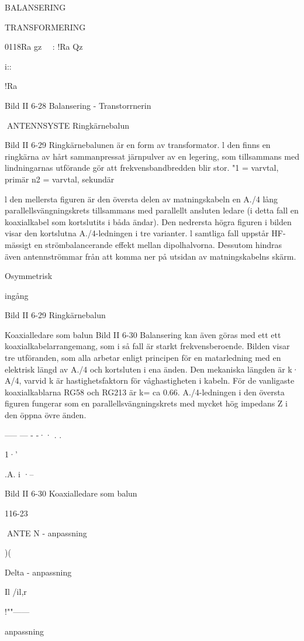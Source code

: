 \documentclass[a4paper,twoside,twocolumn,openright]{book}
\begin{document}
{{{{{BALANSERING

TRANSFORMERING

0118Ra
gz
~~: !Ra
Qz

i::

!Ra

Bild II 6-28 Balansering - Transtorrnerin

ANTENNSYSTE
Ringkärnebalun

Bild II 6-29
Ringkärnebalunen är en form av transformator. l den finns en ringkärna av hårt
sammanpressat järnpulver av en legering,
som tillsammans med lindningarnas utförande gör att frekvensbandbredden blir stor.
"1 = varvtal, primär
n2 = varvtal, sekundär

l den mellersta figuren är den översta
delen av matningskabeln en A./4 lång parallellsvängningskrets tillsammans med parallellt ansluten ledare (i detta fall en koaxialkabel som kortslutits i båda ändar). Den
nedrersta högra figuren i bilden visar den
kortslutna A./4-ledningen i tre varianter. l
samtliga fall uppstår HF-mässigt en strömbalancerande effekt mellan dipolhalvorna.
Dessutom hindras även antennströmmar från att komma ner på utsidan av matningskabelns skärm.

Osymmetrisk

ingång

Bild II 6-29 Ringkärnebalun

Koaxialledare som balun
Bild II 6-30
Balansering kan även göras med ett ett
koaxialkabelarrangemang, som i så fall är
starkt frekvensberoende. Bilden visar tre
utföranden, som alla arbetar enligt principen för en matarledning med en elektrisk
längd av A./4 och kortsluten i ena änden.
Den mekaniska längden är k· A/4, varvid
k är hastighetsfaktorn för våghastigheten i
kabeln. För de vanligaste koaxialkablarna
RG58 och RG213 är k= ca 0.66.
A./4-ledningen i den översta figuren fungerar som en parallellsvängningskrets med
mycket hög impedans Z i den öppna övre
änden.

----- --- - -·· . .

1·'

.A.
i ·--

Bild II 6-30 Koaxialledare som balun

116-23

ANTE N
- anpassning

)(

Delta - anpassning

Il
/il,r

!""------

anpassning

}}}}}
\end{document}
